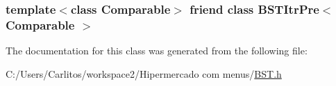 \label{class_binary_node_a5dc153694be266f6e772659486219da7}
\hypertarget{class_binary_node_a45a55df6f11541416d4ea7684c575c1a}{
\subsubsection[{BSTItrPre$<$ Comparable $>$}]{\setlength{\rightskip}{0pt plus 5cm}template$<$class Comparable$>$ friend class {\bf BSTItrPre}$<$ Comparable $>$}}
\label{class_binary_node_a45a55df6f11541416d4ea7684c575c1a}


The documentation for this class was generated from the following file:\begin{DoxyCompactItemize}
\item 
C:/Users/Carlitos/workspace2/Hipermercado com menus/\hyperlink{_b_s_t_8h}{BST.h}\end{DoxyCompactItemize}
